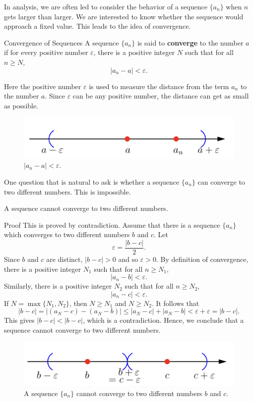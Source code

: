  

In analysis, we are often led to consider the behavior of a sequence $\{a_n\}$ when $n$ gets larger than larger. We are interested to know whether the sequence would approach a fixed value. This leads to the idea of convergence.

\begin{definition}{Convergence of   Sequences}
A sequence $\{a_n\}$ is said to {\bf converge} to the number $a$ if for every positive number $\varepsilon$, there is a positive integer $N$ such that for all $n\geq N$, 
\[|a_n-a|<\varepsilon.\] 
\end{definition}
Here the positive number $\varepsilon$ is used to measure the distance from the term $a_n$ to the number $a$. Since $\varepsilon$ can be any positive number, the distance can get as small as possible. 

 \begin{figure}[ht]
\centering
\includegraphics[scale=0.2]{Picture2.png}

\caption{  $|a_n-a|<\varepsilon$.}\label{figure2}
\end{figure}

One question that is natural to ask is whether a sequence $\{a_n\}$ can converge to two different numbers. This is   impossible.
\begin{theorem}[label=thm23020301]{}
A sequence cannot converge to two different numbers.
\end{theorem}
\begin{myproof}{Proof}
This is proved by contradiction. Assume that there is a sequence $\{a_n\}$ which converges to two different numbers $b$ and $c$.  Let
\[\varepsilon=\frac{|b-c|}{2}.\]
Since $b$ and $c$ are distinct, $|b-c|>0$ and so $\varepsilon>0$. By definition of convergence, there is a positive integer $N_1$ such that for all $n\geq N_1$,
\[|a_n-b|<\varepsilon.\]
Similarly, there is a positive integer $N_2$ such that for all $n\geq N_2$, 
\[|a_n-c|<\varepsilon.\]
If $N=\max\{N_1, N_2\}$, then $N\geq N_1$ and $N\geq N_2$. It follows that
\[|b-c|=|(a_N-c)-(a_N-b)|\leq |a_N-c|+|a_N-b|<\varepsilon+\varepsilon=|b-c|.\]
This gives $|b-c|<|b-c|$, which is a contradiction. Hence, we conclude that a sequence cannot converge to two different numbers.
\end{myproof}
\begin{figure}[ht]
\centering
\includegraphics[scale=0.2]{Picture3.png}

\caption{ A sequence $\{a_n\}$ cannot converge to two different numbers $b$ and $c$.}\label{figure3}
\end{figure}

